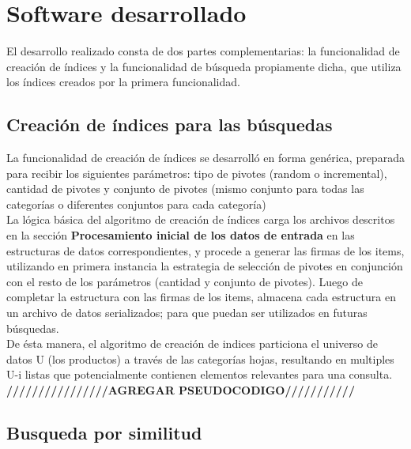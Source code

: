\section{Software desarrollado}

El desarrollo realizado consta de dos partes complementarias: la funcionalidad de creaci\'on de \'indices y la funcionalidad de b\'usqueda propiamente dicha, que utiliza los \'indices creados por la primera funcionalidad.\\



\subsection{Creaci\'on de \'indices para las b\'usquedas}

La funcionalidad de creaci\'on de \'indices se desarroll\'o en forma gen\'erica, preparada para recibir los siguientes par\'ametros: tipo de pivotes (random o incremental), cantidad de pivotes y conjunto de pivotes (mismo conjunto para todas las categor\'ias o diferentes conjuntos para cada categor\'ia)\\

La l\'ogica b\'asica del algoritmo de creaci\'on de \'indices carga los archivos descritos en la secci\'on  \textbf{Procesamiento inicial de los datos de entrada} en las estructuras de datos correspondientes, y procede a generar las firmas de los items, utilizando en primera instancia la estrategia de selecci\'on de pivotes en conjunci\'on con el resto de los par\'ametros (cantidad y conjunto de pivotes). Luego de completar la estructura con las firmas de los items, almacena cada estructura en un archivo de datos serializados; para que puedan ser utilizados en futuras b\'usquedas.\\

De \'esta manera, el algoritmo de creaci\'on de indices particiona el universo de datos U (los productos) a trav\'es de las categor\'ias hojas, resultando en multiples U-i listas que potencialmente contienen elementos relevantes para una consulta.\\






\textbf{////////////////AGREGAR PSEUDOCODIGO///////////}








\subsection{Busqueda por similitud}


